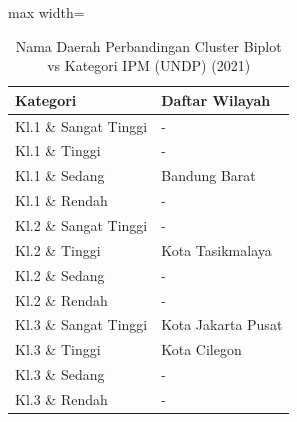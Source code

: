 \begin{table}[H]
\centering
\caption{Nama Daerah Perbandingan Cluster Biplot vs Kategori IPM (UNDP) (2021)} \label{tab:crossname2021}
\begin{adjustbox}{max width=\textwidth}
\begin{tabular}{|p{4cm}|p{10cm}|}
\hline
\textbf{Kategori} & \textbf{Daftar Wilayah} \\
\hline
Kl.1 \& Sangat Tinggi & - \\
\hline
Kl.1 \& Tinggi & - \\
\hline
Kl.1 \& Sedang & Bandung Barat \\
\hline
Kl.1 \& Rendah & - \\
\hline
Kl.2 \& Sangat Tinggi & - \\
\hline
Kl.2 \& Tinggi & Kota Tasikmalaya \\
\hline
Kl.2 \& Sedang & - \\
\hline
Kl.2 \& Rendah & - \\
\hline
Kl.3 \& Sangat Tinggi & Kota Jakarta Pusat \\
\hline
Kl.3 \& Tinggi & Kota Cilegon \\
\hline
Kl.3 \& Sedang & - \\
\hline
Kl.3 \& Rendah & - \\
\hline
\end{tabular}
\end{adjustbox}
\end{table}